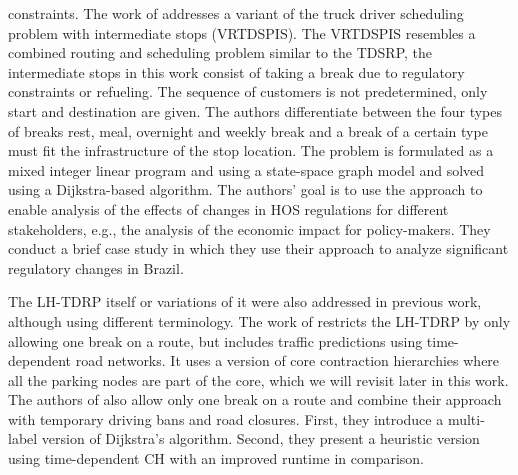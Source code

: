 constraints. The work of \cite{mayerle:2020} addresses a variant of the truck driver scheduling problem with intermediate stops (VRTDSPIS). The VRTDSPIS resembles a combined routing and scheduling problem similar to the TDSRP, the intermediate stops in this work consist of taking a break due to regulatory constraints or refueling. The sequence of customers is not predetermined, only start and destination are given. The authors differentiate between the four types of breaks rest, meal, overnight and weekly break and a break of a certain type must fit the infrastructure of the stop location. The problem is formulated as a mixed integer linear program and using a state-space graph model and solved using a Dijkstra-based algorithm. The authors' goal is to use the approach to enable analysis of the effects of changes in HOS regulations for different stakeholders, e.g., the analysis of the economic impact for policy-makers. They conduct a brief case study in which they use their approach to analyze significant regulatory changes in Brazil.

The LH-TDRP itself or variations of it were also addressed in previous work, although using different terminology. The work of \cite{kleff:2017} restricts the LH-TDRP by only allowing one break on a route, but includes traffic predictions using time-dependent road networks. It uses a version of core contraction hierarchies where all the parking nodes are part of the core, which we will revisit later in this work. The authors of \cite{tuin:2018} also allow only one break on a route and combine their approach with temporary driving bans and road closures. First, they introduce a multi-label version of Dijkstra's algorithm. Second, they present a heuristic version using time-dependent CH with an improved runtime in comparison.

